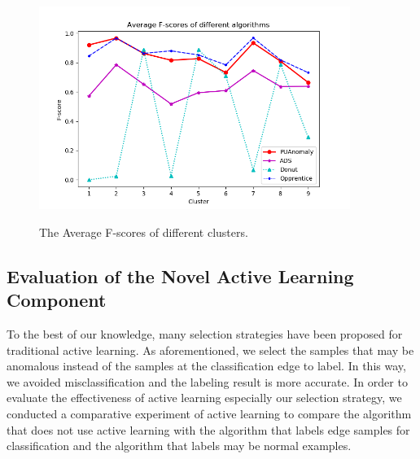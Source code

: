 \begin{figure}
  \setlength{\belowcaptionskip}{0cm}
  \begin{minipage}[H]{1.0\linewidth}
  \centering
  \includegraphics[width=0.9\textwidth]{ADS_Journal/PU figures/myplot2.png}\\
  \end{minipage}
  \caption{The Average F-scores of different clusters.}
  \label{fig:Average Fscore}
\end{figure}


\subsection{Evaluation of the Novel Active Learning Component}
\label{subsec:Different_Active_Learning}

To the best of our knowledge, many selection strategies have been proposed for traditional active learning. 
As aforementioned, 
we select the samples that may be anomalous instead of the samples at the classification edge to label. In this way, we avoided misclassification and the labeling result is more accurate. In order to evaluate the effectiveness of active learning especially our selection strategy, we conducted a comparative experiment of active learning to compare the algorithm that does not use active learning with the algorithm that labels edge samples for classification and the algorithm that labels may be normal examples.

